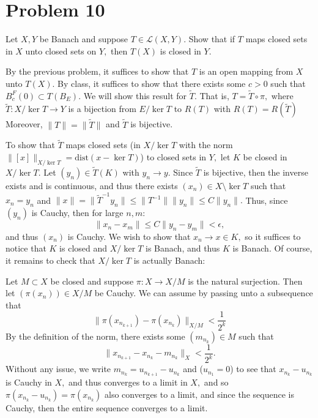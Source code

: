 \documentclass[11pt]{article}
\begin{document}
\newpage
\section*{Problem 10}
\begin{problem}
Let $X,Y$  be Banach and suppose $T\in \mathcal{L}(X,Y).$ Show that if $T$ maps closed sets in $X$ unto closed sets on $Y,$ then $T(X)$ is closed in $Y.$     
\end{problem}

\begin{solution}
    By the previous problem, it suffices to show that $T$ is an open mapping from $X$ unto $T(X).$ By class, it suffices to show that there exists some $c>0$ such that $B_c^F(0)\subset T(B_E).$ We will show this result for $\tilde{T}.$ That is, $T = \tilde{T}\circ \pi,$ where $\tilde{T}: X/\ker T \to Y$ is a bijection from $E/\ker T$ to $R(T)$ with $R(T) = R(\tilde{T})$ Moreover, $\|T\| = \|\tilde{T}\|$ and $\tilde{T}$ is bijective.

    To show that $\tilde{T}$ maps closed sets (in $X/\ker T$ with the norm $\|[x]\|_{X/\ker T} = \text{dist}(x - \ker T)$) to closed sets in $Y,$ let $K$ be closed in $X/\ker T.$ Let $(y_n)\in \tilde{T}(K)$ with $y_n \to y.$ Since $\tilde{T}$ is bijective, then the inverse exists and is continuous, and thus there exists $(x_n)\in X\setminus \ker T$ such that $x_n= y_n$ and $\|x\| = \|\tilde{T}^{-1}y_n\| \leq \|T^{-1}\|\|y_n\| \leq C\|y_n\|.$ Thus, since $(y_n)$ is Cauchy, then for large $n,m:$
    \[\|x_n - x_m\| \leq C\|y_n - y_m\|< \epsilon,\] and thus $(x_n)$ is Cauchy. We wish to show that $x_n \to x \in K,$ so it suffices to notice that $K$ is closed and $X/\ker T$ is Banach, and thus $K$ is Banach. Of course, it remains to check that $X/\ker T$ is actually Banach:

    Let $M\subset X$ be closed and suppose $\pi: X \to X/M$ is the natural surjection. Then let $(\pi(x_n))\in X/M$ be Cauchy. We can assume by passing unto a subsequence that 
    \[\|\pi(x_{n_{k+1}}) - \pi(x_{n_{k}})\|_{X/M} < \frac{1}{2^{k}}\] By the definition of the norm, there exists some $(m_{n_k})\in M$ such that 
    \[\|x_{n_{k+1}} - x_{n_{k}} - m_{n_k}\|_{X} < \frac{1}{2^{k}}.\] Without any issue, we write $m_{n_k} = u_{n_{k+1}} - u_{n_k}$ and ($u_{n_1} = 0$) to see that $x_{n_k} - u_{n_k}$ is Cauchy in $X,$ and thus converges to a limit in $X,$ and so $\pi(x_{n_k} - u_{n_k}) = \pi(x_{n_k})$ also converges to a limit, and since the sequence is Cauchy, then the entire sequence converges to a limit. 


\end{solution}
\end{document}
